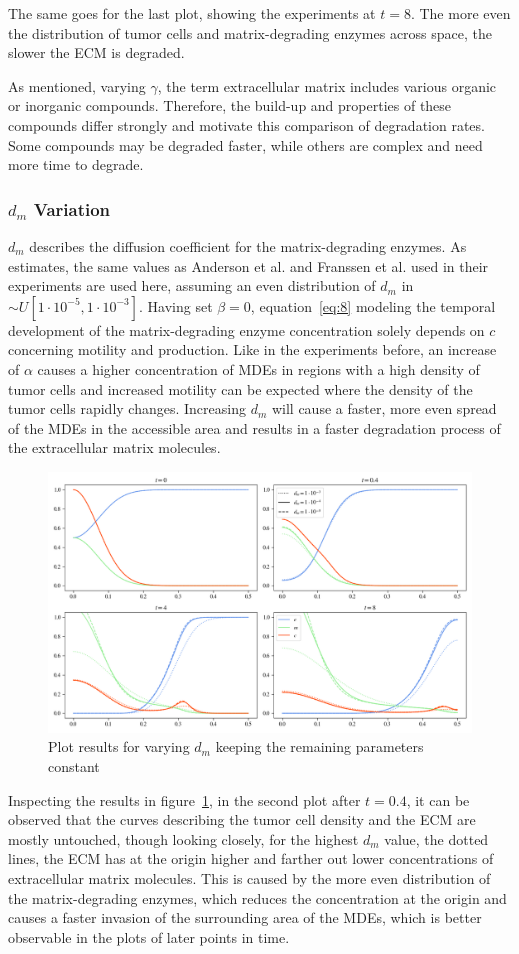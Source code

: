 The same goes for the last plot, showing the experiments at $t=8$. The more even the distribution of tumor cells and matrix-degrading enzymes across space, the slower the ECM is degraded.

As mentioned, varying $\gamma$, the term extracellular matrix includes various organic or inorganic compounds. Therefore, the build-up and properties of these compounds differ strongly and motivate this comparison of degradation rates. Some compounds may be degraded faster, while others are complex and need more time to degrade. 

\subsubsection*{$d_m$ Variation}
$d_m$ describes the diffusion coefficient for the matrix-degrading enzymes. As estimates, the same values as Anderson et al. and Franssen et al. used in their experiments are used here, assuming an even distribution of $d_m$ in $\sim U[1\cdot 10^{-5},1\cdot 10^{-3}]$. Having set $\beta=0$, equation~\ref{eq:8} modeling the temporal development of the matrix-degrading enzyme concentration solely depends on $c$ concerning motility and production. Like in the experiments before, an increase of $\alpha$ causes a higher concentration of MDEs in regions with a high density of tumor cells and increased motility can be expected where the density of the tumor cells rapidly changes. Increasing $d_m$ will cause a faster, more even spread of the MDEs in the accessible area and results in a faster degradation process of the extracellular matrix molecules.
\begin{figure}[h]
 \centering
 \includegraphics[width=\textwidth]{resources/images/dm_variation.png}
 \caption{Plot results for varying $d_m$ keeping the remaining parameters constant}
 \label{fig:dm_variation}
\end{figure}
Inspecting the results in figure~\ref{fig:dm_variation}, in the second plot after $t=0.4$, it can be observed that the curves describing the tumor cell density and the ECM are mostly untouched, though looking closely, for the highest $d_m$ value, the dotted lines, the ECM has at the origin higher and farther out lower concentrations of extracellular matrix molecules. This is caused by the more even distribution of the matrix-degrading enzymes, which reduces the concentration at the origin and causes a faster invasion of the surrounding area of the MDEs, which is better observable in the plots of later points in time.

